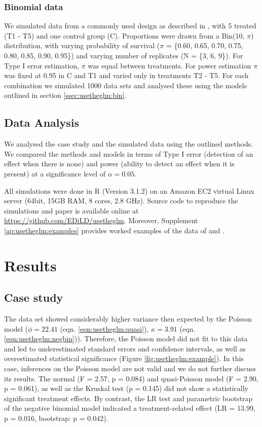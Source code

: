 \clearpage
\subsubsection{Binomial data}
We simulated data from a commonly used design as described in \citet{weber_short-term_1989}, with 5 treated (T1 - T5) and one control group (C). 
Proportions were drawn from a Bin(10, $\pi$) distribution, with varying probability of survival ($\pi$ = \{0.60, 0.65, 0.70, 0.75, 0.80, 0.85, 0.90, 0.95\}) and varying number of replicates (N = \{3, 6, 9\}).
For Type I error estimation, $\pi$ was equal between treatments.
For power estimation $\pi$ was fixed at 0.95  in C and T1 and varied only in treatments T2 - T5. 
For each combination we simulated 1000 data sets and analysed these using the models outlined in section \ref{ssec:usetheglm:bin}.


\subsection{Data Analysis}
\label{ssec:usetheglm:analysis}
We analysed the case study and the simulated data using the outlined methods.
We compared the methods and models in terms of Type I error (detection of an effect when there is none) and power (ability to detect an effect when it is present) at a significance level of $\alpha = 0.05$.

All simulations were done in R (Version 3.1.2) \citep{r_core_team_r:_2014} on an Amazon EC2 virtual Linux server (64bit, 15GB RAM, 8 cores, 2.8 GHz).
Source code to reproduce the simulations and paper is available online at \url{https://github.com/EDiLD/usetheglm}.
Moreover, Supplement \ref{ap:usetheglm:examples} provides worked examples of the data of \citet{brock_minimum_2015} and \citet{weber_short-term_1989}.


\section{Results}
\label{sec:usetheglm:results}
\subsection{Case study}
The data set showed considerably higher variance then expected by the Poisson model ($\phi = 22.41$ (eqn. \ref{eqn:usetheglm:quasi}), $\kappa = 3.91$ (eqn. \ref{eqn:usetheglm:negbin})). 
Therefore, the Poisson model did not fit to this data and led to underestimated standard errors and confidence intervals, as well as overestimated statistical significance (Figure \ref{fig:usetheglm:example}).
In this case, inferences on the Poisson model are not valid and we do not further discuss its results.
The normal (F = 2.57, p = 0.084) and quasi-Poisson model (F = 2.90, p = 0.061), as well as the Kruskal test (p =  0.145) did not show a statistically significant treatment effects.
By contrast, the LR test and parametric bootstrap of the negative binomial model indicated a treatment-related effect (LR = 13.99, p = 0.016, bootstrap: p = 0.042).

